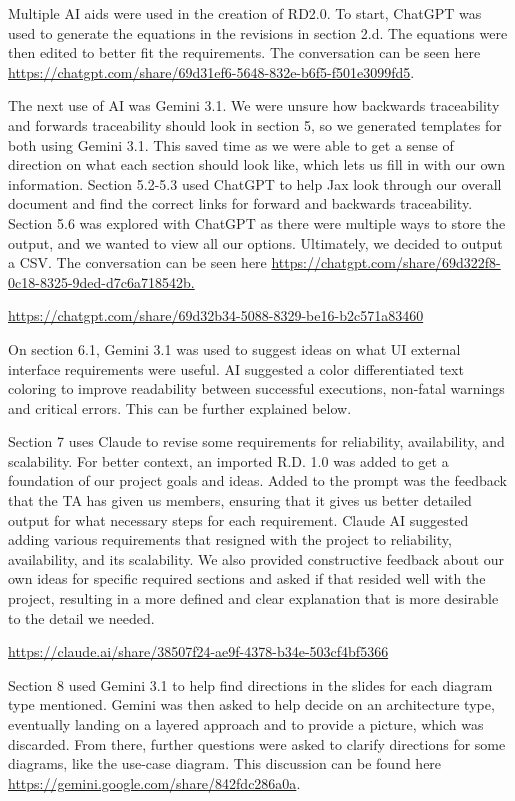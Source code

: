 \documentclass[
]{article}
\begin{document}
Multiple AI aids were used in the creation of RD2.0. To start, ChatGPT
was used to generate the equations in the revisions in section 2.d. The
equations were then edited to better fit the requirements. The
conversation can be seen here
\url{https://chatgpt.com/share/69d31ef6-5648-832e-b6f5-f501e3099fd5}.

The next use of AI was Gemini 3.1. We were unsure how backwards
traceability and forwards traceability should look in section 5, so we
generated templates for both using Gemini 3.1. This saved time as we
were able to get a sense of direction on what each section should look
like, which lets us fill in with our own information. Section 5.2-5.3
used ChatGPT to help Jax look through our overall document and find the
correct links for forward and backwards traceability. Section 5.6 was
explored with ChatGPT as there were multiple ways to store the output,
and we wanted to view all our options. Ultimately, we decided to output
a CSV. The conversation can be seen here
\href{https://chatgpt.com/share/69d322f8-0c18-8325-9ded-d7c6a718542b}{https://chatgpt.com/share/69d322f8-0c18-8325-9ded-d7c6a718542b.}

\url{https://chatgpt.com/share/69d32b34-5088-8329-be16-b2c571a83460}

On section 6.1, Gemini 3.1 was used to suggest ideas on what UI external
interface requirements were useful. AI suggested a color differentiated
text coloring to improve readability between successful executions,
non-fatal warnings and critical errors. This can be further explained
below.

Section 7 uses Claude to revise some requirements for reliability,
availability, and scalability. For better context, an imported R.D. 1.0
was added to get a foundation of our project goals and ideas. Added to
the prompt was the feedback that the TA has given us members, ensuring
that it gives us better detailed output for what necessary steps for
each requirement. Claude AI suggested adding various requirements that
resigned with the project to reliability, availability, and its
scalability. We also provided constructive feedback about our own ideas
for specific required sections and asked if that resided well with the
project, resulting in a more defined and clear explanation that is more
desirable to the detail we needed.

\url{https://claude.ai/share/38507f24-ae9f-4378-b34e-503cf4bf5366}

Section 8 used Gemini 3.1 to help find directions in the slides for each
diagram type mentioned. Gemini was then asked to help decide on an
architecture type, eventually landing on a layered approach and to
provide a picture, which was discarded. From there, further questions
were asked to clarify directions for some diagrams, like the use-case
diagram. This discussion can be found here
\url{https://gemini.google.com/share/842fdc286a0a}.
\end{document}
